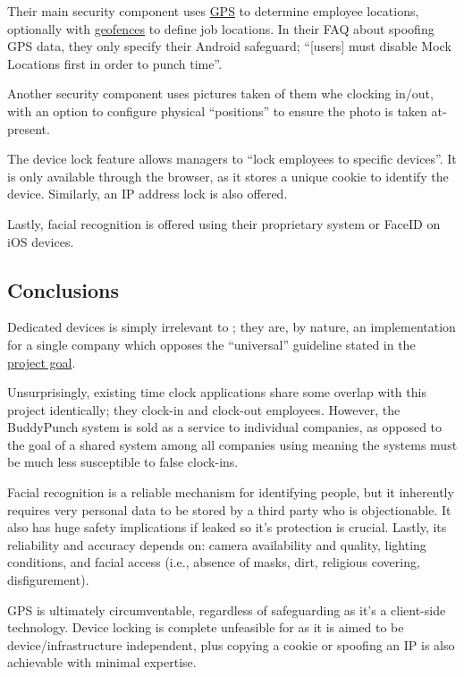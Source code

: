 Their main security component uses \hyperref[ss:gps]{GPS}
to determine employee locations, optionally with
\hyperref[ss:geofencing]{geofences} to define job
locations.
In their FAQ about spoofing GPS data, they only specify
their Android safeguard; \enquote{[users] must disable Mock
  Locations first in order to punch time}.

Another security component uses pictures taken of them whe
clocking in/out, with an option to configure physical
\enquote{positions} to ensure the photo is taken
at-present.

The device lock feature allows managers to \enquote{lock
  employees to specific devices}.
It is only available through the browser, as it stores a
unique cookie to identify the device.
Similarly, an IP address lock is also offered.

Lastly, facial recognition is offered using their
proprietary system or FaceID on iOS devices.

\subsection{Conclusions}

Dedicated devices is simply irrelevant to \projectname{};
they are, by nature, an implementation for a single company
which opposes the \enquote{universal} guideline stated in
the \hyperref[s:goal]{project goal}.

Unsurprisingly, existing time clock applications share some
overlap with this project identically; they clock-in and
clock-out employees.
However, the BuddyPunch system is sold as a service to
individual companies, as opposed to the goal of a shared
system among all companies using \projectname{} meaning the
systems must be much less susceptible to false clock-ins.

Facial recognition is a reliable mechanism for identifying
people, but it inherently requires very personal data to be
stored by a third party who is objectionable. It also has
huge safety implications if leaked so it's protection is
crucial. Lastly, its reliability and accuracy depends on:
camera availability and quality, lighting conditions, and
facial access (i.e., absence of masks, dirt, religious
covering, disfigurement).

GPS is ultimately circumventable, regardless of safeguarding
as it's a client-side technology. Device locking is complete
unfeasible for \projectname{} as it is aimed to be
device/infrastructure independent, plus copying a cookie or
spoofing an IP is also achievable with minimal expertise. 

